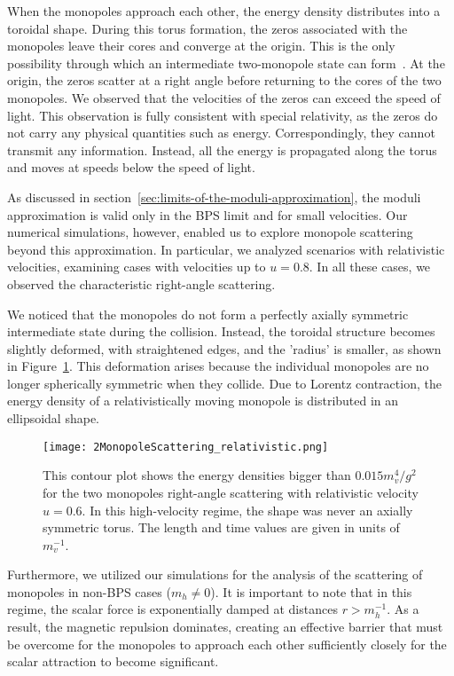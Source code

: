 \documentclass[aps, prd, twocolumn, superscriptaddress, preprintnumbers, nofootinbib, longbibliography]{revtex4-1}
\begin{document}
When the monopoles approach each other, the energy density distributes into a toroidal shape. During this torus formation, the zeros associated with the monopoles leave their cores and converge at the origin. This is the only possibility through which an intermediate two-monopole state can form~\cite{Ward:1981jb}. At the origin, the zeros scatter at a right angle before returning to the cores of the two monopoles. 
We observed that the velocities of the zeros can exceed the speed of light. This observation is fully consistent with special relativity, as the zeros do not carry any physical quantities such as energy.
Correspondingly, they cannot transmit any information.
Instead, all the energy is propagated along the torus and moves at speeds below the speed of light.

As discussed in section~\ref{sec:limits-of-the-moduli-approximation}, the moduli approximation is valid only in the BPS limit and for small velocities. Our numerical simulations, however, enabled us to explore monopole scattering beyond this approximation. In particular, we analyzed scenarios with relativistic velocities, examining cases with velocities up to $u=0.8$. In all these cases, we observed the characteristic right-angle scattering.

We noticed that the monopoles do not form a perfectly axially symmetric intermediate state during the collision. Instead, the toroidal structure becomes slightly deformed, with straightened edges, and the 'radius' is smaller, as shown in Figure~\ref{fig:monopole-scattering-relativistic}. This deformation arises because the individual monopoles are no longer spherically symmetric when they collide. Due to Lorentz contraction, the energy density of a relativistically moving monopole is distributed in an ellipsoidal shape.

\begin{figure}[h]
    \texttt{[image: 2MonopoleScattering\_relativistic.png]}
    \caption{This contour plot shows the energy densities bigger than $0.015 m_v^4/g^2$ for the two monopoles right-angle scattering with relativistic velocity $u=0.6$. In this high-velocity regime, the shape was never an axially symmetric torus. The length and time values are given in units of $m_v^{-1}$.}
    \label{fig:monopole-scattering-relativistic}
\end{figure} 

Furthermore, we utilized our simulations for the analysis of  the scattering of monopoles in non-BPS cases ($m_h \neq 0$). It is important to note that in this regime, the scalar force is exponentially damped
at distances $r > m_h^{-1}$. As a result, the magnetic repulsion dominates, creating an effective barrier that must be overcome for the monopoles to approach each other sufficiently closely 
for the scalar attraction to become significant.
\end{document}
